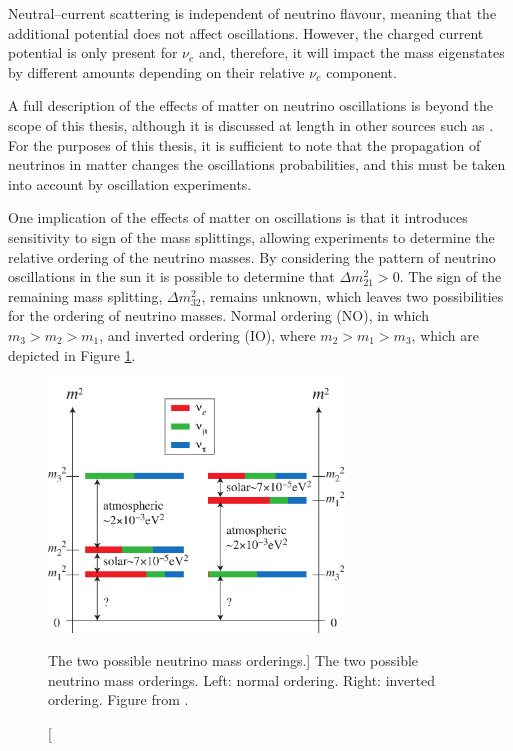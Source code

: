 Neutral--current scattering is independent of neutrino flavour, meaning that
the additional potential does not affect oscillations. However, the charged
current potential is only present for $\nu_e$ and, therefore, it will impact the
mass eigenstates by different amounts depending on their relative $\nu_e$
component.

A full description of the effects of matter on neutrino oscillations is beyond
the scope of this thesis, although it is discussed at length in other sources
such as \cite{GiuntiCarlo2007FoNP}. For the purposes of this thesis, it is
sufficient to note that the propagation of neutrinos in matter changes the
oscillations probabilities, and this must be taken into account by oscillation
experiments.

One implication of the effects of matter on oscillations is that it introduces
sensitivity to sign of the mass splittings\cite{GiuntiCarlo2007FoNP}, 
allowing experiments to determine the relative ordering of the neutrino 
masses. By considering the pattern of neutrino oscillations in the sun it is 
possible to determine that $\Delta m_{21}^2 > 0$\cite{PhysRevD.98.030001}. 
The sign of the remaining mass splitting, $\Delta m_{32}^2$, remains unknown,
which leaves two possibilities for the ordering of neutrino masses. Normal 
ordering (NO), in which $m_3 > m_2 > m_1$, and inverted ordering (IO), where $m_2 > m_1 
> m_3$, which are depicted in Figure \ref{fig:mass_ordering}. 
\begin{figure}
	\centering
	\includegraphics[width=0.7\textwidth]{figures/mass.pdf}
	\caption
	[The two possible neutrino mass orderings.]
	{The two possible neutrino mass orderings. Left: normal ordering. Right: 
	inverted ordering.  Figure from \cite{SKing}.}
	\label{fig:mass_ordering}
\end{figure}

